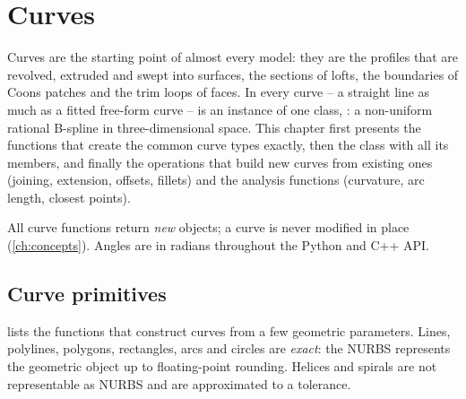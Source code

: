 \chapter{Curves}\label{ch:curves}

Curves are the starting point of almost every model: they are the profiles that are revolved,
extruded and swept into surfaces, the sections of lofts, the boundaries of Coons patches and the
trim loops of faces. In \NF{} every curve -- a straight line as much as a fitted free-form curve
-- is an instance of one class, : a non-uniform rational B-spline in
three-dimensional space. This chapter first presents the functions that create the common curve
types exactly, then the  class with all its members, and finally the operations
that build new curves from existing ones (joining, extension, offsets, fillets) and the analysis
functions (curvature, arc length, closest points).

All curve functions return \emph{new} objects; a curve is never modified in place
(\cref{ch:concepts}). Angles are in radians throughout the Python and C++ API.

\section{Curve primitives}\label{sec:curve-primitives}

 lists the functions that construct curves from a few geometric
parameters. Lines, polylines, polygons, rectangles, arcs and circles are \emph{exact}: the NURBS
represents the geometric object up to floating-point rounding. Helices and spirals are not
representable as NURBS and are approximated to a tolerance.

